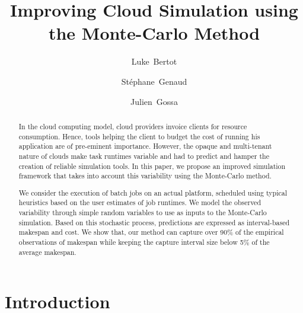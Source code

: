 \documentclass[]{llncs}
\title{Improving Cloud Simulation using the Monte-Carlo Method}
\author{Luke~Bertot
	\and Stéphane~Genaud 
	\and Julien~Gossa}
\institute{Icube-ICPS --- UMR 7357, Univeristé de Strasbourg, CNRS\\
		P\^ole API Blvd S. Bant, 67400 Illkirch%
	}
\begin{document}
\maketitle

\begin{abstract}
  In the  cloud computing  model, cloud providers  invoice clients  for resource
  consumption. Hence, tools helping the client to budget the cost of running his
  application are  of pre-eminent  importance. However, the opaque and 
  multi-tenant nature of clouds make task runtimes variable and had to predict
  and hamper the creation of reliable simulation tools. In this  paper, we 
  propose an improved simulation framework that takes into account this 
  variability using the Monte-Carlo method.

  We consider  the execution of  batch jobs on an actual platform, scheduled
  using typical  heuristics based on the user estimates  of job  runtimes.  We
  model  the observed  variability through  simple  random variables  to use  as
  inputs  to the  Monte-Carlo  simulation.  Based  on  this stochastic  process,
  predictions are expressed as interval-based  makespan and cost.  We show that,
  our method  can capture over  90\% of  the empirical observations  of makespan
  while keeping the capture interval size below 5\% of the average makespan.
\end{abstract}



\section{Introduction}
\end{document}
